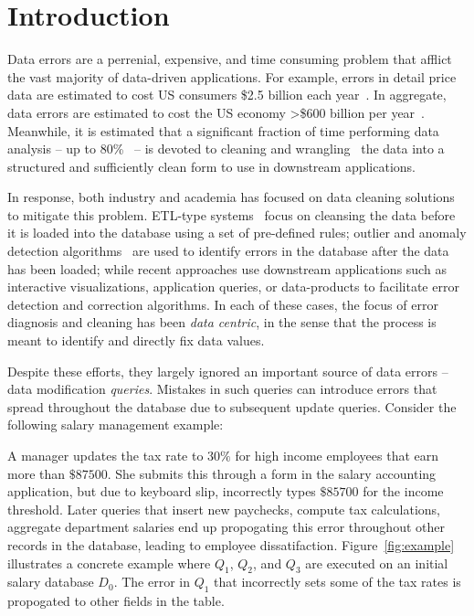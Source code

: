 
\section{Introduction}
\label{s:intro}

Data errors are a perrenial, expensive, and time consuming problem that afflict the vast majority of data-driven applications.
For example, errors in detail price data are estimated to cost US consumers \$2.5 billion each year~\cite{Fan2008}.
In aggregate, data errors are estimated to cost the US economy >\$600 billion per year~\cite{eckerson2002}.
Meanwhile, it is estimated that a significant fraction of time performing data analysis --
up to 80\%~\cite{kandel2012} -- is devoted to cleaning and
wrangling~\cite{kandel2011wrangler} the data into a structured and sufficiently clean form to use in downstream applications.

In response, both industry and academia has focused on data cleaning solutions to mitigate this problem.
ETL-type systems~\cite{systemt,informatica} focus on cleansing the data before it is loaded into the database
using a set of pre-defined rules; outlier and anomaly detection algorithms~\cite{} are used to identify errors
in the database after the data has been loaded; while recent approaches use downstream applications
such as interactive visualizations, application queries, or data-products to facilitate error detection and correction algorithms.
In each of these cases, the focus of error diagnosis and cleaning has been {\it data centric}, in the sense that
the process is meant to identify and directly fix data values.

Despite these efforts, they largely ignored an important source of data errors -- data modification {\it queries}.
Mistakes in such queries can introduce errors that spread throughout the database due to subsequent update queries.
Consider the following salary management example:

\begin{example}\label{ex:telco}
  A manager updates the tax rate to $30\%$ for high income employees that earn more than $\$87500$.
  She submits this through a form in the salary accounting application, 
  but due to keyboard slip, incorrectly types $\$85700$ for the income threshold.  
  Later queries that insert new paychecks, compute tax calculations,
  aggregate department salaries end up propogating this error throughout other records in the database, leading to
  employee dissatifaction.  Figure~\ref{fig:example} illustrates a concrete example where $Q_1$, $Q_2$, and $Q_3$ are executed on an 
  initial salary database $D_0$.  The error in $Q_1$ that incorrectly sets some of the tax rates is propogated to other fields in the table.
\end{example}

